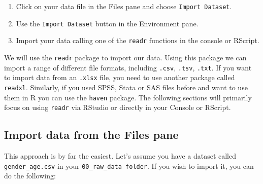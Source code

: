 \documentclass[
]{book}
\begin{document}
\begin{enumerate}
\def\labelenumi{\arabic{enumi}.}
\item
  Click on your data file in the Files pane and choose \texttt{Import\ Dataset}.
\item
  Use the \texttt{Import\ Dataset} button in the Environment pane.
\item
  Import your data calling one of the \texttt{readr} functions in the console or RScript.
\end{enumerate}

We will use the \texttt{readr} package to import our data. Using this package we can import a range of different file formats, including \texttt{.csv}, \texttt{.tsv}, \texttt{.txt}. If you want to import data from an \texttt{.xlsx} file, you need to use another package called \texttt{readxl}. Similarly, if you used SPSS, Stata or SAS files before and want to use them in R you can use the \texttt{haven} package. The following sections will primarily focus on using \texttt{readr} via RStudio or directly in your Console or RScript.

\hypertarget{import-data-from-the-files-pane}{%
\subsection{Import data from the Files pane}\label{import-data-from-the-files-pane}}

This approach is by far the easiest. Let's assume you have a dataset called \texttt{gender\_age.csv} in your \texttt{00\_raw\_data\ folder}. If you wish to import it, you can do the following:
\end{document}
